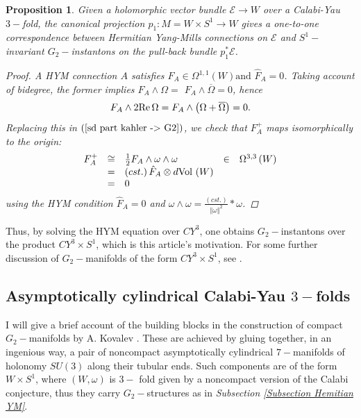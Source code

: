 \documentclass{article}
\newcommand{\func}[1]{\textnormal {#1\,}}
\newcommand{\vol}{\func{Vol}}
\newcommand{\mc}[1]{\mathcal{#1}}
\newtheorem{proposition}[theorem]{Proposition}
\begin{document}
\begin{proposition}
\label{prop HYM over W lifts to instanton on WxS1}
Given a holomorphic vector bundle  $\mathcal{E}\rightarrow W$ over  a Calabi-Yau $3-$fold, the canonical projection $p_1:M=W\times S^1\to W$ gives a one-to-one correspondence between Hermitian Yang-Mills connections on $\mc{E}$ and $S^1-$invariant $G_{2}-$instantons
on the pull-back bundle $p_1^*\mathcal{E}$.
\begin{proof}
A HYM connection $A$ satisfies $F_{A}\in \Omega ^{1,1}\left( W\right) 
\text{and }\hat{F}_{A}=0$. Taking account of bidegree, the former implies $%
F_{A}\wedge \Omega =$ $F_{A}\wedge \overline{\Omega }=0$, hence
\begin{displaymath}
        F_{A}\wedge 2 \func{Re}\Omega 
        =F_{A}\wedge \left( \Omega +\overline{\Omega }\right) 
        =0.
\end{displaymath}
Replacing this in $\left( \ref{sd part kahler -> G2}\right)$, we check that $F_{A}^{+}$ maps isomorphically to the origin:
\begin{displaymath}
        \begin{array}{cclcc}
        F_{A}^{+} & \cong & \tfrac{1}{2} F_{A}\wedge \omega \wedge \omega 
                & \in & \Omega^{3,3}\left( W\right) \\
        &=& \left( cst.\right) \hat{F}_{A}\otimes d\vol\left( W\right)&&\\
        &=& 0 &&\\
        \end{array}
\end{displaymath}
using the HYM condition $\hat{F}_{A}=0$ and  $\omega
\wedge \omega =\frac{\left( cst.\right) }{\left\Vert \omega \right\Vert ^{2}}%
\ast \omega $.
\end{proof}
\end{proposition}

Thus, by solving the HYM
equation over $CY^{3}$, one obtains $G_{2}-$instantons over the product $CY^{3}\times S^1$, which is this article's motivation.
For some further discussion of $G_2-$manifolds of the form $CY^3\times S^1$, see \cite{Baraglia}. 

\subsection{Asymptotically cylindrical Calabi-Yau $3-$folds}
\label{Section ACCY}
I will give a brief account of the
building blocks in the construction of compact $G_{2}-$manifolds by A. Kovalev \cite{kovalevzinho,kovalevzao}.
These are achieved by
gluing together, in an ingenious way, a pair of noncompact asymptotically
cylindrical $7-$manifolds of holonomy $SU\left( 3\right) $ along their
tubular ends. Such components are of the form $W\times S^{1}$, where $\left(W,\omega\right)$ is $3-$%
fold given by a noncompact version of the Calabi conjecture, thus they carry $G_{2}-$structures as  in 
\emph{Subsection \ref{Subsection Hemitian YM}}. 
\end{document}
